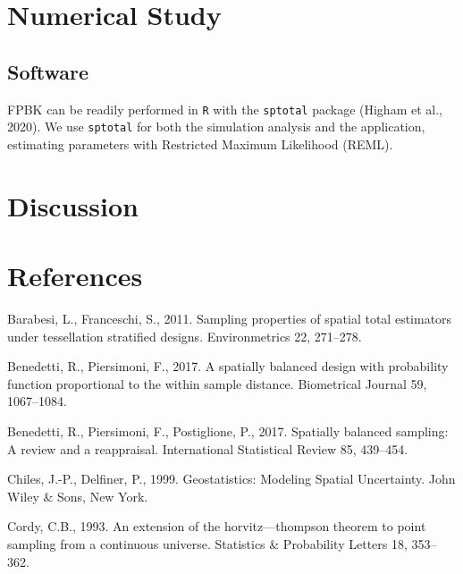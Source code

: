\documentclass[]{elsarticle} %
\begin{document}
\hypertarget{numerical-study}{%
\section{Numerical Study}\label{numerical-study}}

\hypertarget{software}{%
\subsection{Software}\label{software}}

FPBK can be readily performed in \texttt{R} with the \texttt{sptotal}
package (Higham et al., 2020). We use \texttt{sptotal} for both the
simulation analysis and the application, estimating parameters with
Restricted Maximum Likelihood (REML).

\hypertarget{discussion}{%
\section{Discussion}\label{discussion}}

\hypertarget{references}{%
\section*{References}\label{references}}

\hypertarget{refs}{}
\leavevmode\hypertarget{ref-barabesi2011sampling}{}%
Barabesi, L., Franceschi, S., 2011. Sampling properties of spatial total
estimators under tessellation stratified designs. Environmetrics 22,
271--278.

\leavevmode\hypertarget{ref-benedetti2017spatially}{}%
Benedetti, R., Piersimoni, F., 2017. A spatially balanced design with
probability function proportional to the within sample distance.
Biometrical Journal 59, 1067--1084.

\leavevmode\hypertarget{ref-benedetti2017spatiallyreview}{}%
Benedetti, R., Piersimoni, F., Postiglione, P., 2017. Spatially balanced
sampling: A review and a reappraisal. International Statistical Review
85, 439--454.

\leavevmode\hypertarget{ref-chiles1999geostatistics}{}%
Chiles, J.-P., Delfiner, P., 1999. Geostatistics: Modeling Spatial
Uncertainty. John Wiley \& Sons, New York.

\leavevmode\hypertarget{ref-cordy1993extension}{}%
Cordy, C.B., 1993. An extension of the horvitz---thompson theorem to
point sampling from a continuous universe. Statistics \& Probability
Letters 18, 353--362.
\end{document}
